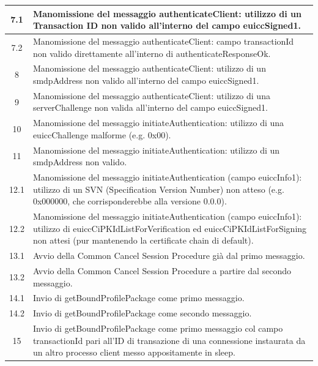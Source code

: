 \documentclass[10pt, oneside]{book}
\begin{document}
\begin{table}[h!]
\begin{center}
\begin{tabularx}{\textwidth}{|c|X|}
\hline
7.1 & Manomissione del messaggio authenticateClient: utilizzo di un Transaction ID non valido all'interno del campo euiccSigned1.\\
\hline
7.2 & Manomissione del messaggio authenticateClient: campo transactionId non valido direttamente all'interno di authenticateResponseOk.\\
\hline
8 & Manomissione del messaggio authenticateClient: utilizzo di un smdpAddress non valido all'interno del campo euiccSigned1.\\
\hline
9 & Manomissione del messaggio authenticateClient: utilizzo di una serverChallenge non valida all'interno del campo euiccSigned1.\\
\hline
10 & Manomissione del messaggio initiateAuthentication: utilizzo di una euiccChallenge malforme (e.g. 0x00).\\
\hline
11 & Manomissione del messaggio initiateAuthentication: utilizzo di un smdpAddress non valido.\\
\hline
12.1 & Manomissione del messaggio initiateAuthentication (campo euiccInfo1): utilizzo di un SVN (Specification Version Number) non atteso (e.g. 0x000000, che corrisponderebbe alla versione 0.0.0).\\
\hline
12.2 & Manomissione del messaggio initiateAuthentication (campo euiccInfo1): utilizzo di euiccCiPKIdListForVerification ed euiccCiPKIdListForSigning non attesi (pur mantenendo la certificate chain di default).\\
\hline
13.1 & Avvio della Common Cancel Session Procedure già dal primo messaggio.\\
\hline
13.2 & Avvio della Common Cancel Session Procedure a partire dal secondo messaggio.\\
\hline
14.1 & Invio di getBoundProfilePackage come primo messaggio.\\
\hline
14.2 & Invio di getBoundProfilePackage come secondo messaggio.\\
\hline
15 & Invio di getBoundProfilePackage come primo messaggio col campo transactionId pari all'ID di transazione di una connessione instaurata da un altro processo client messo appositamente in sleep.\\
\hline
\end{tabularx}
\end{center}
\end{table}
\end{document}
